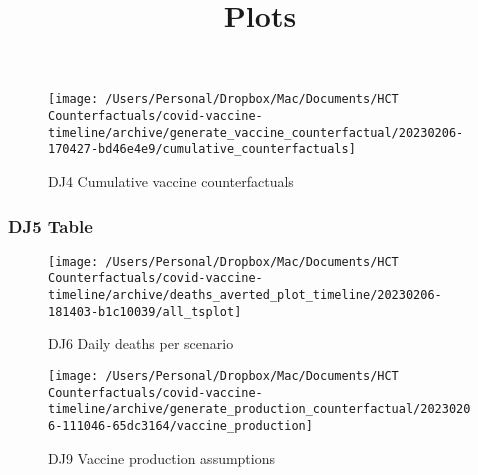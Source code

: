 \documentclass[
]{article}
\title{Plots}
\author{}
\date{\vspace{-2.5em}}
\begin{document}
\maketitle

\begin{figure}

{\centering \texttt{[image: /Users/Personal/Dropbox/Mac/Documents/HCT Counterfactuals/covid-vaccine-timeline/archive/generate\_vaccine\_counterfactual/20230206-170427-bd46e4e9/cumulative\_counterfactuals]} 

}

\caption{DJ4 Cumulative vaccine counterfactuals}\label{fig:cumul-vacc-cfacts}
\end{figure}

\hypertarget{dj5-table}{%
\subsubsection{DJ5 Table}\label{dj5-table}}



\begin{figure}

{\centering \texttt{[image: /Users/Personal/Dropbox/Mac/Documents/HCT Counterfactuals/covid-vaccine-timeline/archive/deaths\_averted\_plot\_timeline/20230206-181403-b1c10039/all\_tsplot]} 

}

\caption{DJ6 Daily deaths per scenario}\label{fig:daily-deaths}
\end{figure}

\begin{figure}

{\centering \texttt{[image: /Users/Personal/Dropbox/Mac/Documents/HCT Counterfactuals/covid-vaccine-timeline/archive/generate\_production\_counterfactual/20230206-111046-65dc3164/vaccine\_production]} 

}

\caption{DJ9 Vaccine production assumptions}\label{fig:prod-assumptions}
\end{figure}
\end{document}

